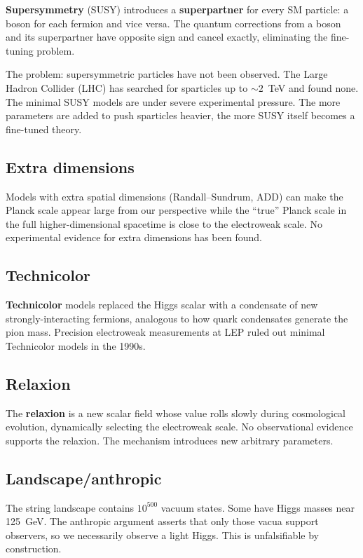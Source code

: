 \documentclass[11pt,a4paper]{article}
\newcommand{\term}[1]{\textbf{#1}}
\begin{document}
\term{Supersymmetry} (SUSY) introduces a \term{superpartner} for every SM particle:
a boson for each fermion and vice versa.
The quantum corrections from a boson and its superpartner have opposite sign
and cancel exactly, eliminating the fine-tuning problem.

The problem: supersymmetric particles have not been observed.
The Large Hadron Collider (LHC) has searched for sparticles up to
$\sim 2$~TeV and found none.
The minimal SUSY models are under severe experimental pressure.
The more parameters are added to push sparticles heavier, the more SUSY
itself becomes a fine-tuned theory.

\subsection{Extra dimensions}

Models with extra spatial dimensions (Randall--Sundrum, ADD) can make
the Planck scale appear large from our perspective while the ``true''
Planck scale in the full higher-dimensional spacetime is close to the
electroweak scale.
No experimental evidence for extra dimensions has been found.

\subsection{Technicolor}

\term{Technicolor} models replaced the Higgs scalar with a condensate of
new strongly-interacting fermions, analogous to how quark condensates
generate the pion mass.
Precision electroweak measurements at LEP ruled out minimal Technicolor
models in the 1990s.

\subsection{Relaxion}

The \term{relaxion} is a new scalar field whose value rolls slowly during
cosmological evolution, dynamically selecting the electroweak scale.
No observational evidence supports the relaxion.
The mechanism introduces new arbitrary parameters.

\subsection{Landscape/anthropic}

The string landscape contains $10^{500}$ vacuum states.
Some have Higgs masses near 125~GeV.
The anthropic argument asserts that only those vacua support observers,
so we necessarily observe a light Higgs.
This is unfalsifiable by construction.
\end{document}
